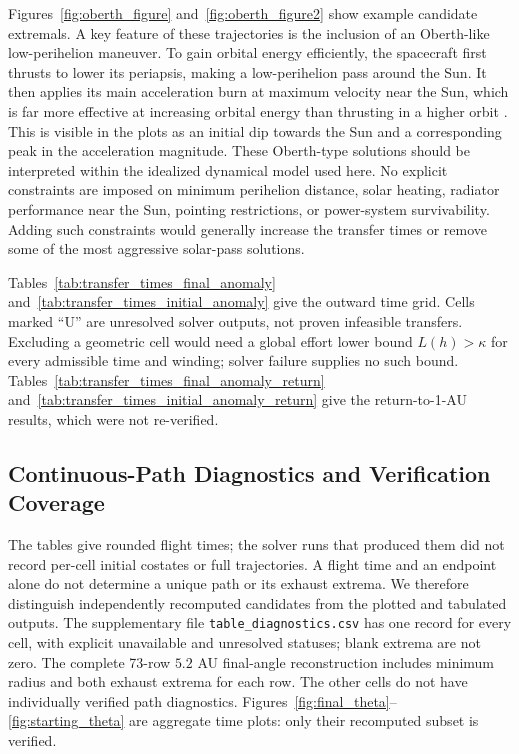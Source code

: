 \documentclass[journal,a4paper]{IEEEtran}
\begin{document}
Figures~\ref{fig:oberth_figure} and~\ref{fig:oberth_figure2} show example candidate extremals. A key feature of these trajectories is the inclusion of an Oberth-like low-perihelion maneuver. To gain orbital energy efficiently, the spacecraft first thrusts to lower its periapsis, making a low-perihelion pass around the Sun. It then applies its main acceleration burn at maximum velocity near the Sun, which is far more effective at increasing orbital energy than thrusting in a higher orbit \cite{Oberth1923}. This is visible in the plots as an initial dip towards the Sun and a corresponding peak in the acceleration magnitude. These Oberth-type solutions should be interpreted within the idealized dynamical model used here. No explicit constraints are imposed on minimum perihelion distance, solar heating, radiator performance near the Sun, pointing restrictions, or power-system survivability. Adding such constraints would generally increase the transfer times or remove some of the most aggressive solar-pass solutions.

Tables~\ref{tab:transfer_times_final_anomaly} and~\ref{tab:transfer_times_initial_anomaly} give the outward time grid. Cells marked ``U'' are unresolved solver outputs, not proven infeasible transfers. Excluding a geometric cell would need a global effort lower bound $L(h)>\kappa$ for every admissible time and winding; solver failure supplies no such bound. Tables~\ref{tab:transfer_times_final_anomaly_return} and~\ref{tab:transfer_times_initial_anomaly_return} give the return-to-1-AU results, which were not re-verified.


\subsection{Continuous-Path Diagnostics and Verification Coverage}
\label{sec:diagnostics}
The tables give rounded flight times; the solver runs that produced them
did not record per-cell initial costates or full trajectories. A flight time and an endpoint
alone do not determine a unique path or its exhaust extrema. We therefore
distinguish independently recomputed candidates from the
plotted and tabulated outputs. The supplementary file
\texttt{table\_diagnostics.csv} has one record for every cell,
with explicit unavailable and unresolved statuses; blank extrema are not
zero. The complete 73-row $5.2$ AU final-angle reconstruction includes
minimum radius and both exhaust extrema for each row. The other
cells do not have individually verified path diagnostics.
Figures~\ref{fig:final_theta}--\ref{fig:starting_theta} are aggregate time
plots: only their recomputed subset is verified.
\end{document}
